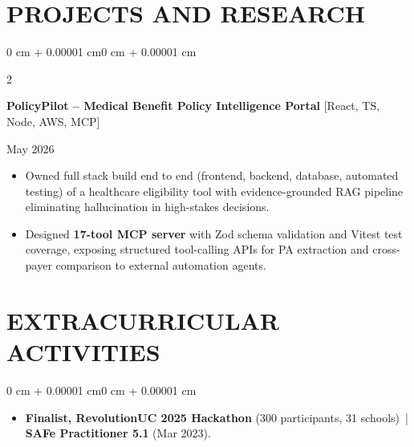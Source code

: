 \documentclass[10pt, letterpaper]{article}
\newenvironment{highlights}{
    \begin{itemize}[
        topsep=0.10 cm,
        parsep=0.06 cm,
        partopsep=0pt,
        itemsep=0.06 cm,
        leftmargin=12pt
    ]
}{
    \end{itemize}
}
\newenvironment{onecolentry}{
    \begin{adjustwidth}{0 cm + 0.00001 cm}{0 cm + 0.00001 cm}
}{
    \end{adjustwidth}
}
\newenvironment{twocolentry}[2][]{
    \onecolentry
    \def\secondColumn{#2}
    \setcolumnwidth{\fill, 4.5 cm}
    \begin{paracol}{2}
}{
    \switchcolumn \raggedleft \secondColumn
    \end{paracol}
    \endonecolentry
}
\begin{document}
\section{PROJECTS AND RESEARCH}
\begin{twocolentry}{May 2026}
\textbf{PolicyPilot -- Medical Benefit Policy Intelligence Portal} [React, TS, Node, AWS, MCP]
\end{twocolentry}
\begin{highlights}
  \item Owned full stack build end to end (frontend, backend, database, automated testing) of a healthcare eligibility tool with evidence-grounded RAG pipeline eliminating hallucination in high-stakes decisions.
  \item Designed \textbf{17-tool MCP server} with Zod schema validation and Vitest test coverage, exposing structured tool-calling APIs for PA extraction and cross-payer comparison to external automation agents.
\end{highlights}

\section{EXTRACURRICULAR ACTIVITIES}
\begin{onecolentry}
\begin{highlights}
  \item \textbf{Finalist, RevolutionUC 2025 Hackathon} (300 participants, 31 schools) \,|\, \textbf{SAFe Practitioner 5.1} (Mar 2023).
\end{highlights}
\end{onecolentry}
\end{document}
